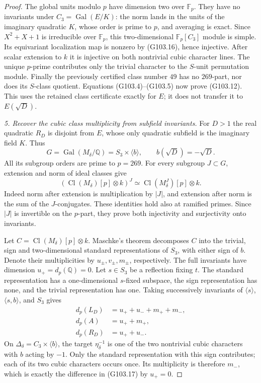 \begin{proof}
The global units modulo $p$ have dimension two over $\mathbb F_p$.
They have no invariants under $C_3=\operatorname{Gal}(E/K)$:
the norm lands in the units of the imaginary quadratic $K$,
whose order is prime to $p$, and averaging is exact.
Since $X^2+X+1$ is irreducible over $\mathbb F_p$, this
two-dimensional $\mathbb F_p[C_3]$ module is simple.
Its equivariant localization map is nonzero by (G103.16), hence
injective.  After scalar extension to $k$ it is injective on
both nontrivial cubic character lines.
The unique $p$-prime contributes only the trivial character
to the $S$-unit permutation module.
Finally the previously certified class number $49$ has no
$269$-part, nor does its $S$-class quotient.
Equations (G103.4)--(G103.5) now prove (G103.12).
This uses the retained class certificate exactly for $E$;
it does not transfer it to $E(\sqrt D)$.

\emph{5. Recover the cubic class multiplicity from subfield invariants.}
For $D>1$ the real quadratic $R_D$ is disjoint from $E$,
whose only quadratic subfield is the imaginary field $K$.
Thus
\[
       G=\operatorname{Gal}(M_\delta/\mathbb Q)
             =S_3\times\langle b\rangle,
 \qquad b(\sqrt D)=-\sqrt D.
 \tag{G103.18}
\]
All its subgroup orders are prime to $p=269$.
For every subgroup $J\subset G$, extension and norm of ideal
classes give
\[
  (\operatorname{Cl}(M_\delta)[p]\otimes k)^J
          \simeq\operatorname{Cl}(M_\delta^J)[p]\otimes k.
 \tag{G103.19}
\]
Indeed norm after extension is multiplication by $|J|$, and
extension after norm is the sum of the $J$-conjugates.
These identities hold also at ramified primes.  Since $|J|$ is
invertible on the $p$-part, they prove both injectivity and
surjectivity onto invariants.

Let $C=\operatorname{Cl}(M_\delta)[p]\otimes k$.
Maschke's theorem decomposes $C$ into the trivial, sign and
two-dimensional standard representations of $S_3$, with either
sign of $b$.  Denote their multiplicities by
$u_\pm,v_\pm,m_\pm$, respectively.
The full invariants have dimension $u_+=d_p(\mathbb Q)=0$.
Let $s\in S_3$ be a reflection fixing $t$.
The standard representation has a one-dimensional $s$-fixed
subspace, the sign representation has none, and the trivial
representation has one.
Taking successively invariants of
$\langle s\rangle$, $\langle s,b\rangle$, and $S_3$ gives
\[
 \begin{split}
 d_p(L_D)&=u_++u_-+m_++m_-,\\
 d_p(A)&=u_++m_+,\\
 d_p(R_D)&=u_++u_-.
 \end{split}
 \tag{G103.20}
\]
On $\Delta_\delta=C_3\times\langle b\rangle$, the target
$\eta_\delta^{-1}$ is one of the two nontrivial cubic
characters with $b$ acting by $-1$.
Only the standard representation with this sign contributes;
each of its two cubic characters occurs once.
Its multiplicity is therefore $m_-$, which is exactly the
difference in (G103.17) by $u_+=0$.


\end{proof}
